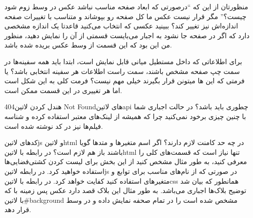 \documentclass[../main.tex]{subfiles}
\begin{document}
 منظورتان از این که ``درصورتی که ابعاد صفحه مناسب نباشد عکس در وسط زوم شود چیست؟''
مگر قرار نیست عکس ما کل صفحه رو بپوشاند و متناسب با تغییرات صفحه اندازه‌اش نیز تغییر کند؟
 ببینید عکسی که انتخاب می‌کنید قاعدتا یک اندازه مشخصی دارد که اگر در صفحه جا نشود به اجبار می‌بایست
قسمتی از آن را نمایش دهید، منظور من این بود که این قسمت از وسط عکس بریده شده باشد.

 برای اطلاعاتی که داخل مستطیل میانی قابل نمایش است،
ابتدا باید همه سفینه‌ها در سمت چپ صفحه مشخص باشند، سمت راست اطلاعات هر سفینه انتخابی باشد؟ یا فرمتی که این ها میتونن قرار بگیرند خیلی مهم نیست؟
 فرمت کلی به این شکل است اما هر تغییری در این قسمت ممکن است.

 هندل کردن ‌لاتین{404 Not Found}های ‌لاتین{api} چطوری باید باشد؟
 در حالت اجباری شما با چنین چیزی برخود نمی‌کنید چرا که همیشه از لینک‌های معتبر استفاده کرده
و شناسه فیلم‌ها نیز در کد نوشته شده است.

 کدهای ‌لاتین{js} و ‌لاتین{html} در چه حد کامنت لازم دارند؟ اگر اسم متغیرها و متدها گویا باشند باز هم لازم است؟
 در رابطه با ‌لاتین{html} تنها نیاز است که قسمت‌های کلی را معرفی کنید،
به طور مثال مشخص کنید از این بخش برای لیست کردن کشتی‌فضایی‌ها استفاده خواهید کرد.
در رابطه ‌لاتین{js} در صورتی که از نام‌های مناسب برای توابع و متغیرهای استفاده کنید کفایت خواهد کرد.
در رابطه با ‌لاتین{css} همانطور که بیان شد توضیح بلاک‌ها اجباری می‌باشد.
به طور مثال این بلاک قصد دارد عکس پس زمینه با که با ‌لاتین{\#background} مشخص شده است را در تمام صحفه نمایش داده و در وسط قرار دهد.

\end{document}
